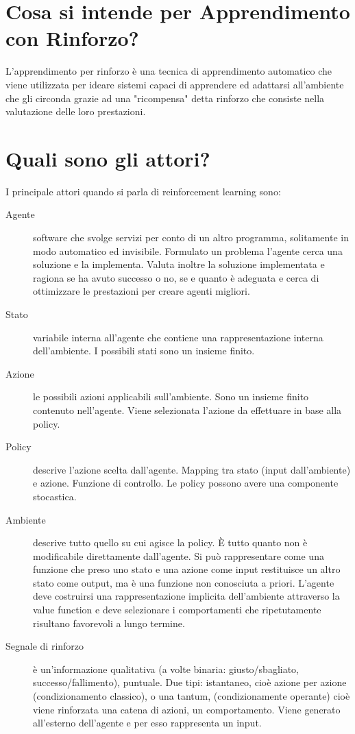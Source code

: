 \documentclass[\main/main.tex]{subfiles}
\begin{document}
\section{Cosa si intende per Apprendimento con Rinforzo?}
L'apprendimento per rinforzo è una tecnica di apprendimento automatico che viene utilizzata per ideare sistemi capaci di apprendere ed adattarsi all'ambiente che gli circonda grazie ad una "ricompensa" detta rinforzo che consiste nella valutazione delle loro prestazioni.

\section{Quali sono gli attori?}
I principale attori quando si parla di reinforcement learning sono: 
\begin{description}
\item [Agente] software che svolge servizi per conto di un altro programma, solitamente in modo automatico ed invisibile. Formulato un problema l’agente cerca una soluzione e la implementa. Valuta inoltre la soluzione implementata e ragiona se ha avuto successo o no, se e quanto è adeguata e cerca di ottimizzare le prestazioni per creare agenti migliori. 
\item [Stato] variabile interna all’agente che contiene una rappresentazione interna dell’ambiente. I possibili stati sono un insieme finito.
\item [Azione] le possibili azioni applicabili sull’ambiente. Sono un insieme finito contenuto nell’agente. Viene selezionata l’azione da effettuare in base alla policy.
\item [Policy] descrive l’azione scelta dall’agente. Mapping tra stato (input dall’ambiente) e azione. Funzione di controllo. Le policy possono avere una componente stocastica. 
\item [Ambiente] descrive tutto quello su cui agisce la policy. È tutto quanto non è modificabile direttamente dall’agente. Si può rappresentare come una funzione che preso uno stato e una azione come input restituisce un altro stato come output, ma è una funzione non conosciuta a priori. L’agente deve costruirsi una rappresentazione implicita dell’ambiente attraverso la value function e deve selezionare i comportamenti che ripetutamente risultano favorevoli a lungo termine.
\item [Segnale di rinforzo] è un’informazione qualitativa (a volte binaria: giusto/sbagliato, successo/fallimento), puntuale. Due tipi: istantaneo, cioè azione per azione (condizionamento classico), o una tantum, (condizionamente operante) cioè viene rinforzata una catena di azioni, un comportamento. Viene generato all’esterno dell’agente e per esso rappresenta un input.

\end{description}
\end{document}

